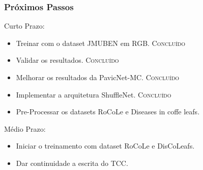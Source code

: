 \documentclass[aspectratio=169]{beamer}
\begin{document}
\begin{frame}
    \frametitle{Próximos Passos}

    \begin{block}{Curto Prazo:}

        \begin{itemize}
            \item Treinar com o dataset JMUBEN em RGB. \textsc{Concluído}
            \item Validar os resultados. \textsc{Concluído}
            \item Melhorar os resultados da PavicNet-MC. \textsc{Concluído}
            \item Implementar a arquitetura ShuffleNet. \textsc{Concluído}
            \item \color{blue} Pre-Processar os datasets RoCoLe e Diseases in coffe leafs.
        \end{itemize}

    \end{block}



    \begin{block}{Médio Prazo:}

        \begin{itemize}
            \item \color{blue} Iniciar o treinamento com dataset RoCoLe e DisCoLeafs.
            \item \color{blue} Dar continuidade a escrita do TCC.
        \end{itemize}

    \end{block}




\end{frame}


\end{document}
